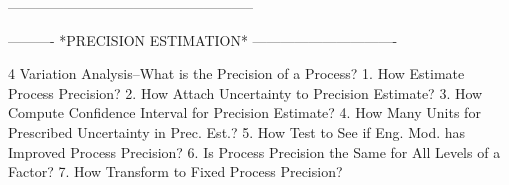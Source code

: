 -----------------------------------------------------
 
 
 
 
 
 
 
 
 
 
 
 
 
 
 
 
 
 
 
 
 
 
 
 
 
 
 
 
 
 
 
 
 
 
 
 
 
 
 
 
 
 
 
 
 
 
 
 
 
 
 
 
 
 
 
 
 
 
 
 
 
 
 
 
 
 
 
 
 
 
 
 
 
 
 
 
 
 
 
 
 
 
 
 
 
 
 
 
 
 
 
 
----------  *PRECISION ESTIMATION*  -------------------------------
 
4
Variation Analysis--What is the Precision of a Process?
   1. How Estimate Process Precision?
   2. How Attach Uncertainty to Precision Estimate?
   3. How Compute Confidence Interval for Precision Estimate?
   4. How Many Units for Prescribed Uncertainty in Prec. Est.?
   5. How Test to See if Eng. Mod. has Improved Process Precision?
   6. Is Process Precision the Same for All Levels of a Factor?
   7. How Transform to Fixed Process Precision?
 
